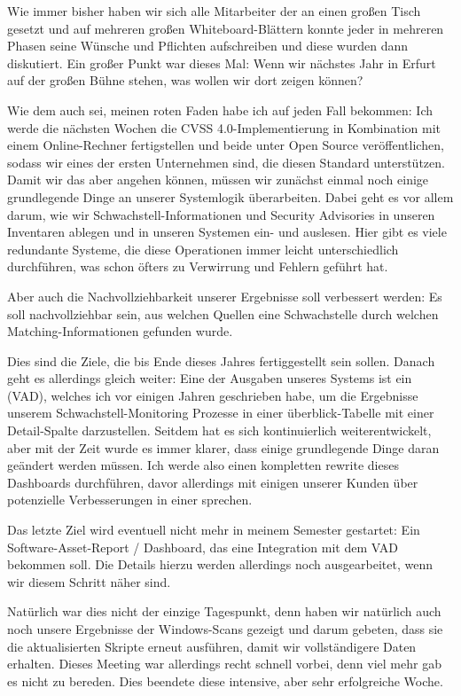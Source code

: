 Wie immer bisher haben wir sich alle Mitarbeiter der {\metaeffekt} an einen großen Tisch gesetzt und auf mehreren großen Whiteboard-Blättern konnte jeder in mehreren Phasen seine Wünsche und Pflichten aufschreiben und diese wurden dann diskutiert.
Ein großer Punkt war dieses Mal:
Wenn wir nächstes Jahr in Erfurt auf der großen Bühne stehen, was wollen wir dort zeigen können?

Wie dem auch sei, meinen roten Faden habe ich auf jeden Fall bekommen:
Ich werde die nächsten Wochen die CVSS 4.0-Implementierung in Kombination mit einem Online-Rechner fertigstellen und beide unter Open Source veröffentlichen, sodass wir eines der ersten Unternehmen sind, die diesen Standard unterstützen.
Damit wir das aber angehen können, müssen wir zunächst einmal noch einige grundlegende Dinge an unserer Systemlogik überarbeiten.
Dabei geht es vor allem darum, wie wir Schwachstell-Informationen und Security Advisories in unseren Inventaren ablegen und in unseren Systemen ein- und auslesen.
Hier gibt es viele redundante Systeme, die diese Operationen immer leicht unterschiedlich durchführen, was schon öfters zu Verwirrung und Fehlern geführt hat.

Aber auch die Nachvollziehbarkeit unserer Ergebnisse soll verbessert werden:
Es soll nachvollziehbar sein, aus welchen Quellen eine Schwachstelle durch welchen Matching-Informationen gefunden wurde.

Dies sind die Ziele, die bis Ende dieses Jahres fertiggestellt sein sollen.
Danach geht es allerdings gleich weiter:
Eine der Ausgaben unseres Systems ist ein  (VAD), welches ich vor einigen Jahren geschrieben habe, um die Ergebnisse unserem Schwachstell-Monitoring Prozesse in einer überblick-Tabelle mit einer Detail-Spalte darzustellen.
Seitdem hat es sich kontinuierlich weiterentwickelt, aber mit der Zeit wurde es immer klarer, dass einige grundlegende Dinge daran geändert werden müssen.
Ich werde also einen kompletten rewrite dieses Dashboards durchführen, davor allerdings mit einigen unserer Kunden über potenzielle Verbesserungen in einer  sprechen.

Das letzte Ziel wird eventuell nicht mehr in meinem Semester gestartet:
Ein Software-Asset-Report / Dashboard, das eine Integration mit dem VAD bekommen soll.
Die Details hierzu werden allerdings noch ausgearbeitet, wenn wir diesem Schritt näher sind.

Natürlich war dies nicht der einzige Tagespunkt, denn {\aeclientZEZESE} haben wir natürlich auch noch unsere Ergebnisse der Windows-Scans gezeigt und darum gebeten, dass sie die aktualisierten Skripte erneut ausführen, damit wir vollständigere Daten erhalten.
Dieses Meeting war allerdings recht schnell vorbei, denn viel mehr gab es nicht zu bereden.
Dies beendete diese intensive, aber sehr erfolgreiche Woche.
